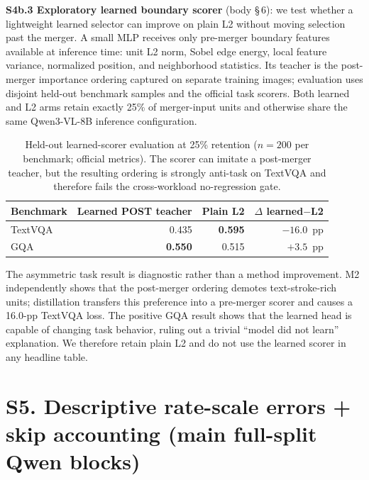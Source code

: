 \documentclass[journal]{IEEEtran}
\begin{document}
\noindent\textbf{S4b.3 Exploratory learned boundary scorer} (body \S\,6):
we test whether a lightweight learned selector can improve on plain L2 without
moving selection past the merger. A small MLP receives only pre-merger
boundary features available at inference time: unit L2 norm, Sobel edge energy,
local feature variance, normalized position, and neighborhood statistics. Its
teacher is the post-merger importance ordering captured on separate training
images; evaluation uses disjoint held-out benchmark samples and the official
task scorers. Both learned and L2 arms retain exactly 25\% of merger-input
units and otherwise share the same Qwen3-VL-8B inference configuration.

\begin{table}[ht]
  \centering
  \small
  \begin{tabular}{@{}l r r r@{}}
    \toprule
    Benchmark & Learned POST teacher & Plain L2 & $\Delta$ learned$-$L2 \\
    \midrule
    TextVQA & 0.435 & \textbf{0.595} & $-16.0$~pp \\
    GQA     & \textbf{0.550} & 0.515 & $+3.5$~pp \\
    \bottomrule
  \end{tabular}
  \caption{Held-out learned-scorer evaluation at 25\% retention
  ($n=200$ per benchmark; official metrics). The scorer can imitate a
  post-merger teacher, but the resulting ordering is strongly anti-task on
  TextVQA and therefore fails the cross-workload no-regression gate.}
  \label{tab:supp_learned}
\end{table}

The asymmetric task result is diagnostic rather than a method improvement.
M2 independently shows that the post-merger ordering demotes
text-stroke-rich units; distillation transfers this preference into a
pre-merger scorer and causes a 16.0-pp TextVQA loss. The positive GQA result
shows that the learned head is capable of changing task behavior, ruling out a
trivial ``model did not learn'' explanation. We therefore retain plain L2 and
do not use the learned scorer in any headline table.

\section*{S5. Descriptive rate-scale errors + skip accounting (main full-split Qwen blocks)}
\end{document}
